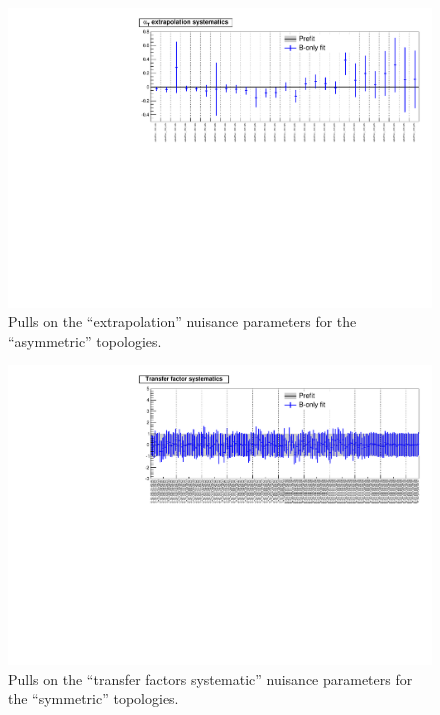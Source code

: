 \newpage
\begin{landscape}
\begin{figure}[h!]
\caption{Pulls on the ``\alt extrapolation'' nuisance parameters for the ``asymmetric'' topologies.\label{fig:nuisPull_alphaT_asym}}
    \includegraphics[width=\linewidth]{figures/postFitResults/alphaT_asym_ALL_nuisances.pdf}
\end{figure}
\end{landscape}


\newpage
\begin{landscape}
\begin{figure}[h!]
\caption{Pulls on the ``transfer factors systematic'' nuisance parameters for the ``symmetric'' topologies.\label{fig:nuisPull_TF_sym}}
    \includegraphics[width=\linewidth]{figures/postFitResults/TF_sym_ALL_nuisances.pdf}
\end{figure}
\end{landscape}



